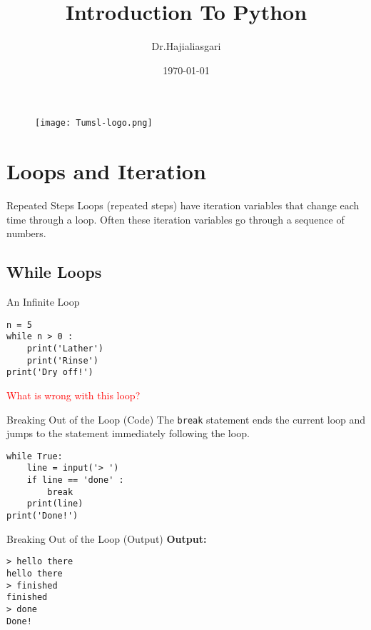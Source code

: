 \documentclass[serif, aspectratio=169]{beamer}
\author{Dr.Hajialiasgari}
\title{Introduction To Python}
\institute{
    Tehran University \\
    Of\\
    Medical Science
}
\date{\small \today}
\begin{document}
\begin{frame}
    \titlepage
    \vspace*{-0.6cm}
    \begin{figure}[htpb]
        \begin{center}
            \texttt{[image: Tumsl-logo.png]}
        \end{center}
    \end{figure}
\end{frame}

\begin{frame}    
\tableofcontents[sectionstyle=show, subsectionstyle=show/shaded/hide, subsubsectionstyle=show/shaded/hide]
\end{frame}

\section{Loops and Iteration}

\begin{frame}{Repeated Steps}
    Loops (repeated steps) have iteration variables that change each time through a loop. Often these iteration variables go through a sequence of numbers.
\end{frame}

\subsection{While Loops}

\begin{frame}[fragile]{An Infinite Loop}
    \begin{verbatim}
n = 5
while n > 0 :
    print('Lather')
    print('Rinse')
print('Dry off!')
    \end{verbatim}
    \textcolor{red}{What is wrong with this loop?}
\end{frame}

\begin{frame}[fragile]{Breaking Out of the Loop (Code)}
    The \texttt{break} statement ends the current loop and jumps to the statement immediately following the loop.

    \begin{lstlisting}
while True:
    line = input('> ')
    if line == 'done' :
        break
    print(line)
print('Done!')
    \end{lstlisting}
\end{frame}

\begin{frame}[fragile]{Breaking Out of the Loop (Output)}
    \textbf{Output:}
    \begin{verbatim}
> hello there
hello there
> finished
finished
> done
Done!
    \end{verbatim}
\end{frame}
\end{document}

